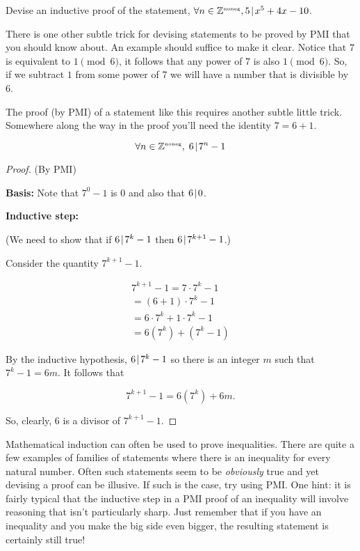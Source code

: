 \begin{exer}
Devise an inductive proof of the statement, $\forall n \in {\mathbb Z}^{\mbox{\tiny noneg}}, 5 \!\mid\! x^5+4x-10$.
\end{exer}

There is one other subtle trick for devising statements to be
proved by PMI that you should know about.  An example should 
suffice to make it clear.  Notice that $7$ is equivalent to $1 \pmod{6}$,
it follows that any power of $7$ is also $1 \pmod{6}$.  So, if we subtract
$1$ from some power of 7 we will have a number that is divisible by $6$.

The proof (by PMI) of a statement like this requires another subtle little
trick.  Somewhere along the way in the proof you'll need the identity $7=6+1$.

\begin{thm}
\[ \forall n \in {\mathbb Z}^{\mbox{\tiny noneg}}, \; 6 \!\mid\! 7^n-1 \]
\end{thm}

\begin{proof} (By PMI)

{\bf Basis:}  Note that $7^0-1$ is $0$ and also that $6 \!\mid\! 0$.

{\bf Inductive step:}  

\noindent (We need to show that if $6 \!\mid\! 7^k-1$ then $6 \!\mid\! 7^{k+1}-1$.)

\noindent Consider the quantity $7^{k+1}-1$.

\begin{gather*}
7^{k+1}-1 = 7 \cdot 7^k -1 \\
 = (6 + 1) \cdot 7^k - 1 \\
 = 6 \cdot 7^k + 1 \cdot 7^k - 1\\
 = 6(7^k) + (7^k - 1)
\end{gather*}

\noindent By the inductive hypothesis, $6 \!\mid\! 7^k - 1$ so there is
an integer $m$ such that $7^k - 1 = 6m$.  It follows that

\[ 7^{k+1}-1 = 6(7^k) + 6m. \]

So, clearly, $6$ is a divisor of $7^{k+1}-1$.

\end{proof}

Mathematical induction 
can often be used to prove inequalities.  There are quite a few examples
of families of statements where there is an inequality for every natural
number.  Often such statements seem to be \emph{obviously} true and yet 
devising a proof can be illusive.  If such is the case, try using PMI.
One hint: it is fairly typical that the inductive step in a PMI proof
of an inequality will involve reasoning that isn't particularly sharp. 
Just remember that if you have an inequality and you make the big
side even bigger, the resulting statement is certainly still true! 

